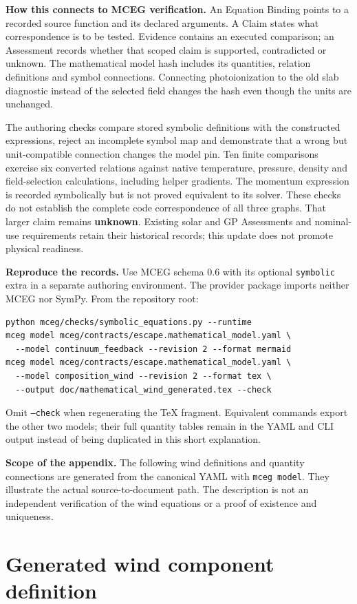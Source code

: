 \documentclass[10pt,a4paper]{article}
\begin{document}
\textbf{How this connects to MCEG verification.}
An Equation Binding points to a recorded source function and its declared
arguments. A Claim states what correspondence is to be tested. Evidence
contains an executed comparison; an Assessment records whether that scoped
claim is supported, contradicted or unknown. The mathematical model hash
includes its quantities, relation definitions and symbol connections.
Connecting photoionization to the old slab diagnostic instead of the selected
field changes the hash even though the units are unchanged.

The authoring checks compare stored symbolic definitions with the constructed
expressions, reject an incomplete symbol map and demonstrate that a wrong but
unit-compatible connection changes the model pin. Ten finite comparisons
exercise six converted relations against native temperature, pressure, density
and field-selection calculations, including helper gradients. The momentum
expression is recorded symbolically but is not proved equivalent to its solver.
These checks do not establish the complete code correspondence of all three
graphs. That larger claim remains \textbf{unknown}. Existing solar and GP
Assessments and nominal-use requirements retain their historical records;
this update does not promote physical readiness.

\textbf{Reproduce the records.}
Use MCEG schema 0.6 with its optional \texttt{symbolic} extra in a separate
authoring environment. The provider package imports neither MCEG nor SymPy.
From the repository root:
\begin{verbatim}
python mceg/checks/symbolic_equations.py --runtime
mceg model mceg/contracts/escape.mathematical_model.yaml \
  --model continuum_feedback --revision 2 --format mermaid
mceg model mceg/contracts/escape.mathematical_model.yaml \
  --model composition_wind --revision 2 --format tex \
  --output doc/mathematical_wind_generated.tex --check
\end{verbatim}
Omit \texttt{--check} when regenerating the TeX fragment. Equivalent commands
export the other two models; their full quantity tables remain in the YAML
and CLI output instead of being duplicated in this short explanation.

\textbf{Scope of the appendix.}
The following wind definitions and quantity connections are generated from
the canonical YAML with \texttt{mceg model}. They illustrate the actual
source-to-document path. The description is not an independent verification
of the wind equations or a proof of existence and uniqueness.

\clearpage
\appendix
\section*{Generated wind component definition}

\end{document}
